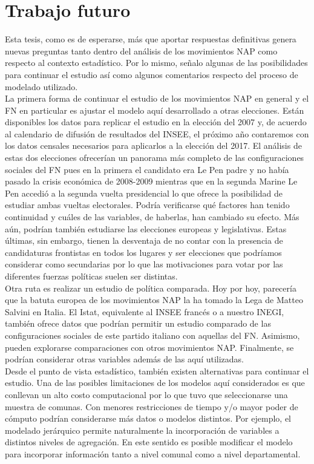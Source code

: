 \section*{Trabajo futuro}

Esta tesis, como es de esperarse, más que aportar respuestas definitivas genera nuevas preguntas tanto dentro del análisis de los movimientos NAP como respecto al contexto estadístico. Por lo mismo, señalo algunas de las posibilidades para continuar el estudio así como algunos comentarios respecto del proceso de modelado utilizado.\\

La primera forma de continuar el estudio de los movimientos NAP en general y el FN en particular es ajustar el modelo aquí desarrollado a otras elecciones. Están disponibles los datos para replicar el estudio en la elección del 2007 y, de acuerdo al calendario de difusión de resultados del INSEE, el próximo año contaremos con los datos censales necesarios para aplicarlos a la elección del 2017. El análisis de estas dos elecciones ofrecerían un panorama más completo de las configuraciones sociales del FN pues en la primera el candidato era Le Pen padre y no había pasado la crisis económica de 2008-2009 mientras que en la segunda Marine Le Pen accedió a la segunda vuelta presidencial lo que ofrece la posibilidad de estudiar ambas vueltas electorales. Podría verificarse qué factores han tenido continuidad y cuáles de las variables, de haberlas, han cambiado su efecto. Más aún, podrían también estudiarse las elecciones europeas y legislativas. Estas últimas, sin embargo, tienen la desventaja de no contar con la presencia de candidaturas frontistas en todos los lugares y ser elecciones que podríamos considerar como secundarias por lo que las motivaciones para votar por las diferentes fuerzas políticas suelen ser distintas.\\

Otra ruta es realizar un estudio de política comparada. Hoy por hoy, parecería que la batuta europea de los movimientos NAP la ha tomado la Lega de Matteo Salvini en Italia. El Istat, equivalente al INSEE francés o a nuestro INEGI, también ofrece datos que podrían permitir un estudio comparado de las configuraciones sociales de este partido italiano con aquellas del FN. Asimismo, pueden explorarse comparaciones con otros movimientos NAP. Finalmente, se podrían considerar otras variables además de las aquí utilizadas.\\

Desde el punto de vista estadístico, también existen alternativas para continuar el estudio. Una de las posibles limitaciones de los modelos aquí considerados es que conllevan un alto costo computacional por lo que tuvo que seleccionarse una muestra de comunas. Con menores restricciones de tiempo y/o mayor poder de cómputo podrían considerarse más datos o modelos distintos. Por ejemplo, el modelado jerárquico permite naturalmente la incorporación de variables a distintos niveles de agregación. En este sentido es posible modificar el modelo para incorporar información tanto a nivel comunal como a nivel departamental.\\ 

